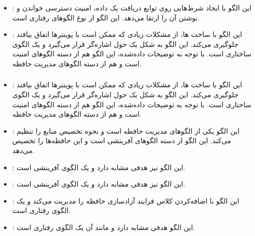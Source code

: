 \subsubsection{}
\begin{itemize}
\item {}: %
این الگو با ایجاد شرط‌هایی روی توابع دریافت یک داده،
امنیت دسترسی خواندن و نوشتن آن را ارتقا می‌دهد.
این الگو از نوع الگوهای رفتاری است.
\item {}: %
این الگو با ساخت ها، از مشکلات زیادی
که ممکن است با پوینترها اتفاق بیافتد جلوگیری می‌کند.
این الگو به شکل یک  حول اشاره‌گر قرار
می‌گیرد و یک الگوی ساختاری است. با توجه به توضیحات
داده‌شده، این الگو هم از دسته الگوهای
امنیت است و هم از دسته الگوهای مدیریت حافظه.
\end{itemize}

\subsubsection{}
\begin{itemize}
\item {}: %
این الگو با ساخت ها، از مشکلات زیادی
که ممکن است با پوینترها اتفاق بیافتد جلوگیری می‌کند.
این الگو به شکل یک  حول اشاره‌گر قرار
می‌گیرد و یک الگوی ساختاری است. با توجه به توضیحات
داده‌شده، این الگو هم از دسته الگوهای
امنیت است و هم از دسته الگوهای مدیریت حافظه.
\item {}: %
این الگو یکی از الگوهای مدیریت حافظه است و نحوه تخصیص منابع
را تنظیم می‌کند. این الگو از دسته الگوهای آفرینشی است و
این حافظه‌ها را تخصیص می‌دهد.
\item {}: %
این الگو نیز هدفی مشابه 
دارد و یک الگوی آفرینشی است.
\item {}: %
این الگو نیز هدفی مشابه 
دارد و یک الگوی آفرینشی است.
\item {}: %
این الگو با اضافه‌کردن کلاس 
فرایند آزادسازی حافظه را مدیریت می‌کند و یک الگوی رفتاری است.
\item {}: %
این الگو هدفی مشابه 
دارد و مانند آن یک الگوی رفتاری است.
\end{itemize}